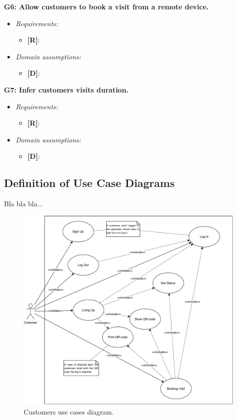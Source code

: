 \textbf{G6: Allow customers to book a visit from a remote device.}
\begin{itemize}
\item \textit{Requirements:}
\begin{itemize}
	\item {\textbf{[R]}}:
\end{itemize}

\item \textit{Domain assumptions:}
\begin{itemize}
	\item {\textbf{[D]}}:
\end{itemize}
\end{itemize}

\textbf{G7: Infer customers visits duration.}	
\begin{itemize}
\item \textit{Requirements:}
\begin{itemize}
	\item {\textbf{[R]}}:
\end{itemize}

\item \textit{Domain assumptions:}
\begin{itemize}
	\item {\textbf{[D]}}:
\end{itemize}
\end{itemize}

\subsection{Definition of Use Case Diagrams}

Bla bla bla...

\begin{figure}[H]
	\centering
	\includegraphics[width=1.0\textwidth]{images/customers_use_cases_diagram.pdf}
	\caption{Customers use cases diagram.}
	\label{customersUseCasesDiagram}
\end{figure}

